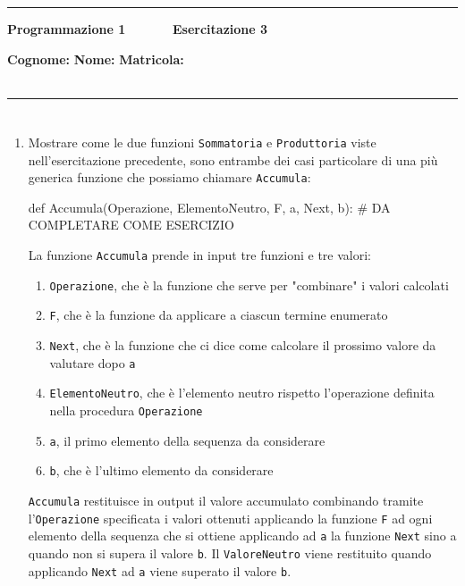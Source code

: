 \documentclass[11pt,a4]{article}
\begin{document}
\thispagestyle{empty}
\hrule
\begin{center}
   {\Large {\bf Programmazione 1 \hspace{3cm} $\quad \quad \quad$ Esercitazione 3}}
\end{center}
{\bf Cognome: }\hspace{2.5cm} {\bf Nome: } \hspace{2.5cm} {\bf Matricola: } \\\
\hrule

\section*{}
\begin{enumerate}

\item Mostrare come le due funzioni {\tt Sommatoria} e {\tt Produttoria} viste nell'esercitazione precedente, sono
entrambe dei casi particolare di una più generica funzione che possiamo chiamare {\tt Accumula}:
\begin{python}
def Accumula(Operazione, ElementoNeutro, F, a, Next, b):
    # DA COMPLETARE COME ESERCIZIO
\end{python}
La funzione {\tt Accumula} prende in input tre funzioni e tre valori:
\begin{enumerate}
\item {\tt Operazione}, che è la funzione che serve per "combinare" i valori calcolati
\item {\tt F}, che è la funzione da applicare a ciascun termine enumerato
\item {\tt Next}, che è la funzione che ci dice come calcolare il prossimo valore da valutare dopo {\tt a}
\item {\tt ElementoNeutro}, che è l'elemento neutro rispetto l'operazione definita nella procedura {\tt Operazione}
\item {\tt a}, il primo elemento della sequenza da considerare
\item {\tt b}, che è l'ultimo elemento da considerare 
\end{enumerate}
{\tt Accumula} restituisce in output il valore accumulato combinando tramite l'{\tt Operazione} specificata i valori ottenuti
applicando la funzione {\tt F} ad ogni elemento della sequenza che si ottiene
applicando ad {\tt a} la funzione {\tt Next} sino a quando non si supera il valore {\tt b}.
Il {\tt ValoreNeutro} viene restituito quando applicando {\tt Next} ad {\tt a} viene superato il valore {\tt b}.


\end{enumerate}
\end{document}
